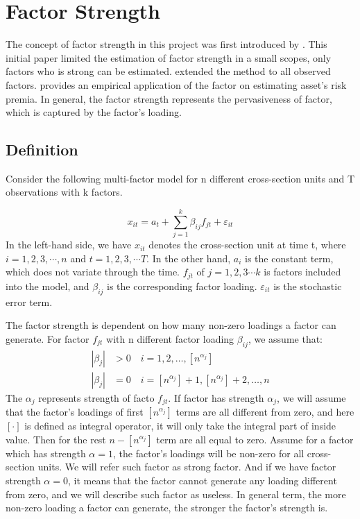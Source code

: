 \documentclass[12pt]{article}
\begin{document}
\section{Factor Strength}\label{strength}
The concept of factor strength in this project was first introduced by . 
This initial paper limited the estimation of factor strength in a small scopes, only factors who is strong can be estimated.
 extended the method to all observed factors. 
 provides an empirical application of the factor on estimating asset's risk premia.
In general, the factor strength represents the pervasiveness of factor, which is captured by the factor's loading.
	\subsection{Definition}

Consider the following multi-factor model for n different cross-section units and T observations with k  factors.

\[  x_{it} = a_{t}+  \sum_{j=1}^{k}\beta_{ij}f_{jt} + \varepsilon_{it} \tag{1}\label{definition_model} \]
In the left-hand side, we have $x_{it}$ denotes the cross-section unit at time t, where $i = 1, 2,3, \cdots, n$ and $t = 1,2,3, \cdots T$.  
In the other hand, $a_{i}$ is the constant term, which does not variate through the time.
$f_{jt}$ of $j = 1, 2, 3\cdots k$ is factors included into the model, and $\beta_{ij}$ is the corresponding factor loading.
$\varepsilon_{it}$ is the stochastic error term.

The factor strength is dependent on how many non-zero loadings a factor can generate.
For factor $f_{jt}$ with n different factor loading $\beta_{ij}$, we assume that:
\begin{align*}
|\beta_{j}| &> 0\quad i = 1, 2,  \dots, [n^{\alpha_j}]\\
|\beta_{j}| &= 0 \quad i = [n^{\alpha_j}] + 1, [n^{\alpha_j}] +2 ,\dots, n
\end{align*}
The $\alpha_j$ represents strength of facto $f_{jt}$.
If factor has strength $\alpha_j$, we will assume that the factor's loadings of first $[n^{\alpha_j}]$ terms are all different from zero, and here $[\cdot] $  is defined as integral operator, it will only take the integral part of inside value.%
Then for the rest $n - [n^{\alpha_j}]$ term are all equal to zero. %
Assume for a factor which has strength $\alpha = 1$, the factor's loadings will be non-zero for all cross-section units.
We will refer such factor as strong factor.
And if we have factor strength $\alpha = 0$, it means that the factor cannot generate any loading different from zero, and we will describe such factor as useless.
In general term, the more non-zero loading a factor can generate, the stronger the factor's strength is. 
\end{document}
